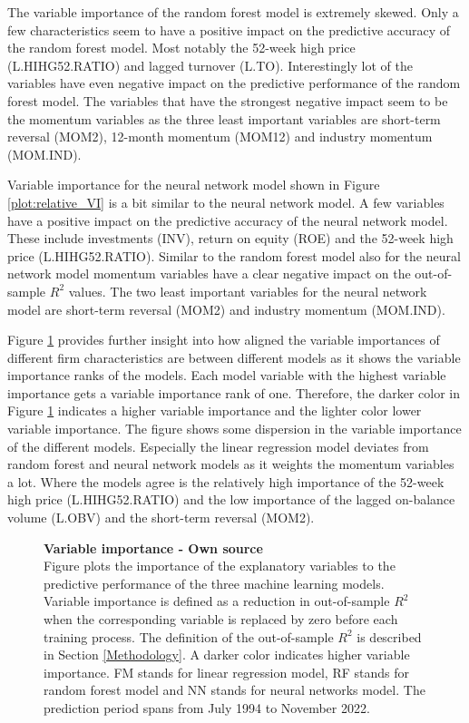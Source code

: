 \documentclass[12pt]{article}
\begin{document}
The variable importance of the random forest model is extremely skewed. Only a few characteristics seem to have a positive impact on the predictive accuracy of the random forest model. Most notably the 52-week high price (L.HIHG52.RATIO) and lagged turnover (L.TO). Interestingly lot of the variables have even negative impact on the predictive performance of the random forest model. The variables that have the strongest negative impact seem to be the momentum variables as the three least important variables are short-term reversal (MOM2), 12-month momentum (MOM12) and industry momentum (MOM.IND). \par

Variable importance for the neural network model shown in Figure \ref{plot:relative_VI} is a bit similar to the neural network model. A few variables have a positive impact on the predictive accuracy of the neural network model. These include investments (INV), return on equity (ROE) and the 52-week high price (L.HIHG52.RATIO). Similar to the random forest model also for the neural network model momentum variables have a clear negative impact on the out-of-sample $R^2$ values. The two least important variables for the neural network model are short-term reversal (MOM2) and industry momentum (MOM.IND). \par

Figure \ref{plot:combined_VI} provides further insight into how aligned the variable importances of different firm characteristics are between different models as it shows the variable importance ranks of the models. Each model variable with the highest variable importance gets a variable importance rank of one. Therefore, the darker color in Figure \ref{plot:combined_VI} indicates a higher variable importance and the lighter color lower variable importance. The figure shows some dispersion in the variable importance of the different models. Especially the linear regression model deviates from random forest and neural network models as it weights the momentum variables a lot. Where the models agree is the relatively high importance of the 52-week high price (L.HIHG52.RATIO) and the low importance of the lagged on-balance volume (L.OBV) and the short-term reversal (MOM2). \par

\begin{figure}[ht]
\centering
\caption[Variable importance]{\textbf{Variable importance \textnormal{- Own source}}\\ Figure plots the importance of the explanatory variables to the predictive performance of the three machine learning models. Variable importance is defined as a reduction in out-of-sample $R^2$ when the corresponding variable is replaced by zero before each training process. The definition of the out-of-sample $R^2$ is described in Section \ref{Methodology}. A darker color indicates higher variable importance. FM stands for linear regression model, RF stands for random forest model and NN stands for neural networks model. The prediction period spans from July 1994 to November 2022.}

\label{plot:combined_VI}
\end{figure}
\end{document}
